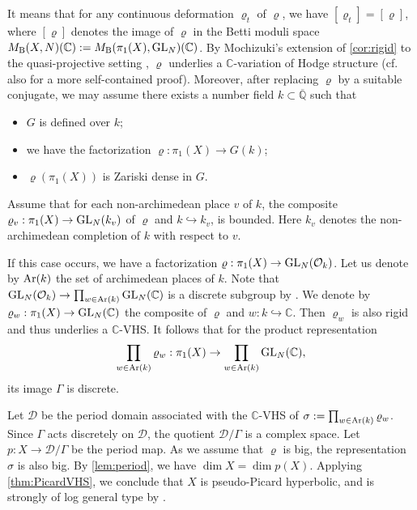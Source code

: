 \documentclass[english]{amsproc}
\theoremstyle{plain}
\theoremstyle{definition}
\theoremstyle{remark}
\theoremstyle{plain}
\numberwithin{equation}{thm} %
\newcommand{\sD}{\mathscr{D}}
\newcommand{\cO}{\mathcal O}
\newcommand{\bC}{\mathbb{C}}
\newcommand{\bQ}{\mathbb{Q}}
\newcommand{\GL}{{\rm GL}}
\begin{document}
	   It means that for any continuous deformation $\varrho_t$ of $\varrho$, we have $[\varrho_t]=[\varrho]$, where $[\varrho]$ denotes the image of $\varrho$ in the Betti moduli space $M_{\rm B}(X,N)(\bC):=M_{\rm B}(\pi_1(X),\GL_{N})(\bC)$.  By Mochizuki's extension of \cref{cor:rigid} to the quasi-projective setting \cite{Moc06}, $\varrho$ underlies a $\bC$-variation of Hodge structure (cf. also \cite[\S 6]{CDY22} for a more self-contained proof). Moreover, after replacing $\varrho$ by a suitable conjugate, we may assume there exists  a number field $k\subset \overline{\bQ}$ such that 
	\begin{itemize}
		\item $G$ is defined over $k$;
		\item we have the factorization $\varrho:\pi_1(X)\to G(k)$;
		\item $\varrho(\pi_1(X))$ is Zariski dense in $G$.
	\end{itemize}
	
	   Assume that for each non-archimedean place $v$ of $k$, the composite $\varrho_v:\pi_1(X)\to \GL_{N}(k_v)$ of $\varrho$ and $k\hookrightarrow k_v$, is bounded. Here $k_v$ denotes the non-archimedean completion of $k$ with respect to $v$. 
	
	If this case occurs, we have a factorization $\varrho:\pi_1(X)\to \GL_{N}(\cO_k)$. Let us denote by  ${\rm Ar}(k)$ the set of archimedean places of $k$.  Note that ${\rm GL}_N(\cO_k)\to \prod_{w\in {\rm Ar}(k)}{\rm GL}_N(\bC)$ is a discrete subgroup  by \cite[Proposition 6.1.3]{Zim}. We denote by $\varrho_w:\pi_1(X)\to \GL_{N}(\bC)$ the composite of $\varrho$ and $w:k\hookrightarrow \bC$.  Then $\varrho_w$ is also rigid and thus underlies a $\bC$-VHS.   It follows that  for the product representation
	$$
	\prod_{w\in {\rm Ar}(k)}\varrho_w:\pi_1(X)\to \prod_{w\in {\rm Ar}(k)}{\rm GL}_N(\bC),
	$$
	its image $\Gamma$ is discrete. 
	
	Let $\sD$ be the period domain associated with the $\bC$-VHS of
	$\sigma := \prod_{w\in {\rm Ar}(k)} \varrho_w$.
	Since $\Gamma$ acts discretely on $\sD$, the quotient $\sD/\Gamma$ is a complex space.
	Let $p\colon X \to \sD/\Gamma$ be the period map.
	As we assume that $\varrho$ is big, the representation $\sigma$ is also big.
	By \cref{lem:period}, we have $\dim X = \dim p(X)$.
	Applying \cref{thm:PicardVHS}, we conclude that $X$ is pseudo-Picard hyperbolic, and  is strongly of log general type by \cite{BC20,CD21}.
	
\end{document}
